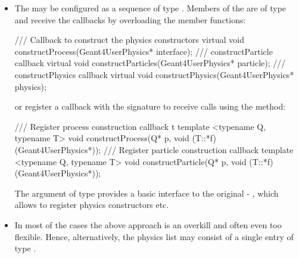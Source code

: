 \documentclass[10pt,a4paper]{article}
\begin{document}
\begin{itemize}
\item The  may be configured as a sequence of type 
    {}.
    Members of the 
    {} are of type
    {} and receive the callbacks by overloading 
    the member functions:
\begin{unnumberedcode}
  /// Callback to construct the physics constructors
  virtual void constructProcess(Geant4UserPhysics* interface);
  /// constructParticle callback
  virtual void constructParticles(Geant4UserPhysics* particle);
  /// constructPhysics callback
  virtual void constructPhysics(Geant4UserPhysics* physics);
\end{unnumberedcode}
    or register a callback with the signature {}
    to receive calls using the method:
\begin{unnumberedcode}
  /// Register process construction callback t
  template <typename Q, typename T> void constructProcess(Q* p, void (T::*f)(Geant4UserPhysics*));
  /// Register particle construction callback
  template <typename Q, typename T> void constructParticle(Q* p, void (T::*f)(Geant4UserPhysics*));
\end{unnumberedcode}
    The argument of type 
    {} provides a basic interface to the original
    - , which allows to register physics constructors etc.

\item In most of the cases the above approach is an overkill and often even too flexible.
    Hence, alternatively, the physics list may consist of a single entry of type 
    {}.
\end{itemize}
\end{document}
